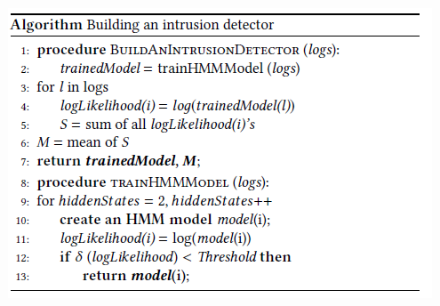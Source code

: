 \begin{enumerate}

\begin{figure}[ht]
    \centering
    \includegraphics[scale=0.75,keepaspectratio = true]{Graphics/Algo.png}
    \label{fig:algo}
\end{figure}


\end{enumerate}
